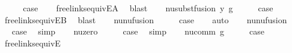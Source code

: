 \begin{isabellebody}
\ \ \isamarkupfalse%
\ \isamarkupfalse%
\ {\isacharquery}{\kern0pt}case\isanewline
\ \ \isamarkupfalse%
\ freelinks{\isacharunderscore}{\kern0pt}equiv{\isacharunderscore}{\kern0pt}E{}A\ \isamarkupfalse%
\ blast\isanewline
{}\isamarkupfalse%
\isanewline
\ \ \isamarkupfalse%
\ {\isacharparenleft}{\kern0pt}nu{\isacharunderscore}{\kern0pt}subst{\isacharunderscore}{\kern0pt}fusion{}\ y\ g{\isacharparenright}{\kern0pt}\isanewline
\ \ \isamarkupfalse%
\ \isamarkupfalse%
\ {\isacharquery}{\kern0pt}case\isanewline
\ \ \isamarkupfalse%
\ freelinks{\isacharunderscore}{\kern0pt}equiv{\isacharunderscore}{\kern0pt}E{}B\ \isamarkupfalse%
\ blast\isanewline
{}\isamarkupfalse%
\isanewline
\ \ \isamarkupfalse%
\ {\isacharparenleft}{\kern0pt}nu{\isacharunderscore}{\kern0pt}nu{\isacharunderscore}{\kern0pt}fusion{}{\isacharparenright}{\kern0pt}\isanewline
\ \ \isamarkupfalse%
\ \isamarkupfalse%
\ {\isacharquery}{\kern0pt}case\isanewline
\ \ \isamarkupfalse%
\ auto\isanewline
{}\isamarkupfalse%
\isanewline
\ \ \isamarkupfalse%
\ {\isacharparenleft}{\kern0pt}nu{\isacharunderscore}{\kern0pt}nu{\isacharunderscore}{\kern0pt}fusion{}{\isacharparenright}{\kern0pt}\isanewline
\ \ \isamarkupfalse%
\ \isamarkupfalse%
\ {\isacharquery}{\kern0pt}case\ \isamarkupfalse%
\ simp\isanewline
{}\isamarkupfalse%
\isanewline
\ \ \isamarkupfalse%
\ {\isacharparenleft}{\kern0pt}nu{\isacharunderscore}{\kern0pt}zero{\isacharparenright}{\kern0pt}\isanewline
\ \ \isamarkupfalse%
\ \isamarkupfalse%
\ {\isacharquery}{\kern0pt}case\ \isamarkupfalse%
\ simp\isanewline
{}\isamarkupfalse%
\isanewline
\ \ \isamarkupfalse%
\ {\isacharparenleft}{\kern0pt}nu{\isacharunderscore}{\kern0pt}comm\ g{\isacharparenright}{\kern0pt}\isanewline
\ \ \isamarkupfalse%
\ \isamarkupfalse%
\ {\isacharquery}{\kern0pt}case\isanewline
\ \ \isamarkupfalse%
\ freelinks{\isacharunderscore}{\kern0pt}equiv{\isacharunderscore}{\kern0pt}E{}\ \isamarkupfalse%

\end{isabellebody}
